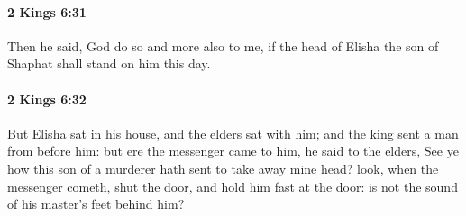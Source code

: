		\paragraph{2 Kings 6:31} %
			\label{2KINGS-6-31}

			Then he said, God do so and more also to me, if the head of Elisha the son of Shaphat shall stand on him this day.


		\paragraph{2 Kings 6:32} %
			\label{2KINGS-6-32}

			But Elisha sat in his house, and the elders sat with him; and the king sent a man from before him: but ere the messenger came to him, he said to the elders, See ye how this son of a murderer hath sent to take away mine head? look, when the messenger cometh, shut the door, and hold him fast at the door: is not the sound of his master’s feet behind him?

